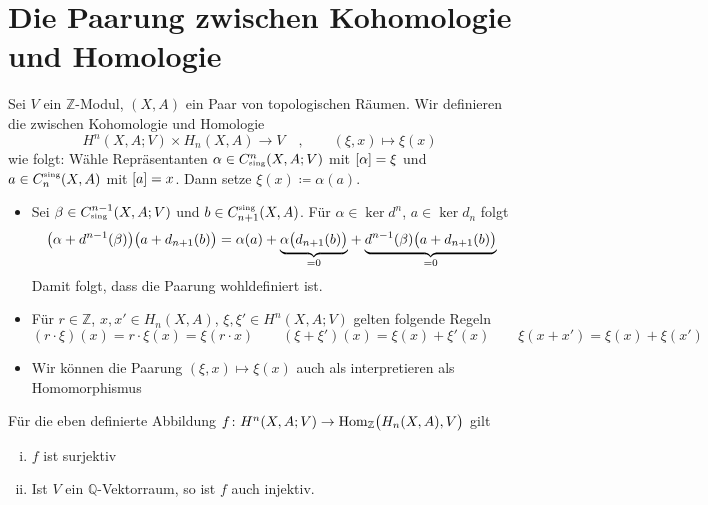 \section{Die Paarung zwischen Kohomologie und Homologie} %
\label{sec:2}

\begin{definition}[{name=[Paarung]}]
	Sei $V$ ein $\mathbb{Z}$-Modul, $(X,A)$ ein Paar von topologischen Räumen. Wir definieren die  zwischen Kohomologie und Homologie 
	\[
		H^n(X,A;V) \times H_n(X,A) \longrightarrow V \quad , \qquad (\xi,x) \longmapsto \xi(x)
	\]
	wie folgt: Wähle Repräsentanten $\alpha \in C^n_\sing(X,A;V)$ mit $\benbrace*{\alpha}=\xi$ und $a \in C^\sing_n(X,A)$ mit $\benbrace*{a}=x$. Dann setze $\xi(x) \coloneqq \alpha(a)$.
\end{definition}

\begin{bemerkung}[{name=[Grundlegende Eigenschaften der Paarung]}]
	\leavevmode
	\begin{itemize}[itemsep=0pt]
		\item Sei $\beta \in C^{n-1}_\sing(X,A;V)$ und $b \in C^\sing_{n+1}(X,A)$. Für $\alpha \in \ker d^n$, $a \in\ker d_n$ folgt 
		\[
			\enbrace*{\alpha + d^{n-1}(\beta)}\enbrace[\big]{a + d_{n+1}(b)} = \alpha(a) + \Underbrace{\alpha \enbrace[\big]{d_{n+1}(b)}}{=0 } 
			+ \Underbrace{d^{n-1}(\beta) \enbrace[\big]{a + d_{n+1}(b)}}{=0}
		\]
		Damit folgt, dass die Paarung wohldefiniert ist.
		\item Für $r \in \mathbb{Z}$, $x,x' \in H_n(X,A)$, $\xi,\xi' \in H^n(X,A;V)$ gelten folgende Regeln
		\[
			(r \cdot \xi)(x) = r \cdot \xi(x) = \xi(r \cdot x) \qquad (\xi +\xi')(x) = \xi(x) + \xi'(x) \qquad \xi(x+x')= \xi(x) + \xi(x')
		\]
		\item Wir können die Paarung $(\xi,x)\mapsto \xi(x)$ auch als interpretieren als Homomorphismus
		\end{itemize}
\end{bemerkung}


\begin{satz}[label=eig_kohomo_to_hom_homo,{name=[Paarung von Kohomologie in Homomorphismen über Homologie ist surjektiv]}]
	Für die eben definierte Abbildung $f \colon H^n(X,A;V) \to \Hom_\mathbb{Z} \enbrace[\big]{H_n(X,A),V}$ gilt
	\begin{enumerate}[(i),itemsep=0pt]
		\item $f$ ist surjektiv
		\item Ist $V$ ein $\mathbb{Q}$-Vektorraum, so ist $f$ auch injektiv.
	\end{enumerate}
\end{satz}

